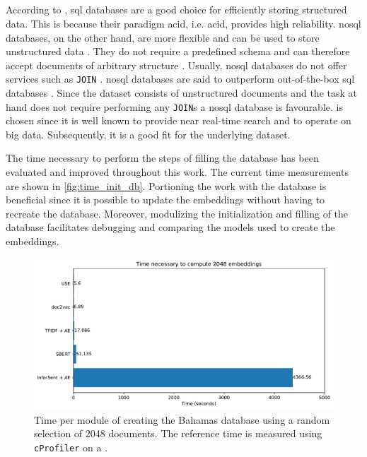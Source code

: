 \subsection*{\databaseName{}}\label{subsec:evaluation-db}
According to \citeauthor{flask_book2018}, \ac{sql} databases are a good choice for efficiently storing structured data.
This is because their paradigm \acs{acid}, i.e. \acl{acid}, provides high reliability.
\ac{nosql} databases, on the other hand, are more flexible and can be used to store unstructured data \cite{flask_book2018}.
They do not require a predefined schema and can therefore accept documents of arbitrary structure \cite{flask2018}.
Usually, \ac{nosql} databases do not offer services such as \texttt{JOIN} \cite{flask2018}.
\ac{nosql} databases are said to outperform out-of-the-box \ac{sql} databases \cite{flask2018}.
Since the dataset consists of unstructured documents and the task at hand does not require performing any \texttt{JOIN}s a \ac{nosql} database is favourable.
\databaseName{} is chosen since it is well known to provide near real-time search and to operate on big data.
Subsequently, it is a good fit for the underlying dataset.

The time necessary to perform the steps of filling the \databaseName{} database has been evaluated and improved throughout this work.
The current time measurements are shown in \autoref{fig:time_init_db}.
Portioning the work with the database is beneficial since it is possible to update the embeddings without having to recreate the database.
Moreover, modulizing the initialization and filling of the database facilitates debugging and comparing the models used to create the embeddings.

\begin{figure}[!htb] %
    \centering
    \includegraphics[width=1\textwidth]{images/Elasticsearch/Time_necessary_to_compute_2048_embeddings.pdf}
    \caption[Times for creating the database]{Time per module of creating the Bahamas database using a random selection of 2048 documents.
    The reference time is measured using \texttt{cProfiler} on a \localMaschineStats{}.
    }
    \label{fig:time_init_db}
\end{figure}


